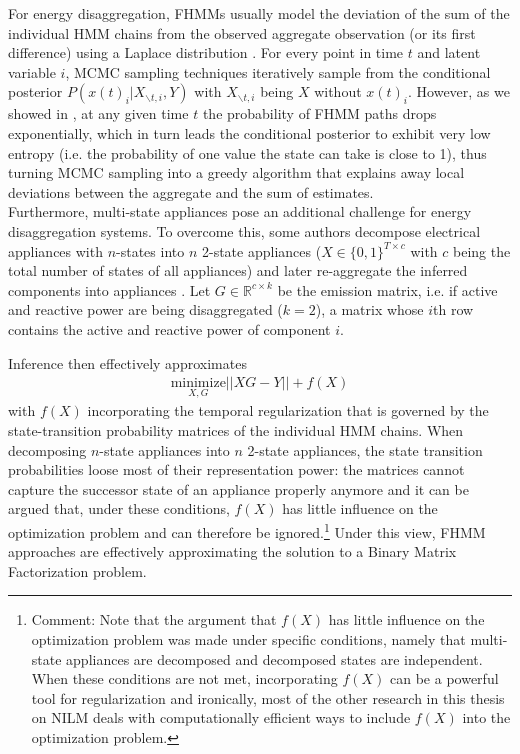 For energy disaggregation, FHMMs usually model the deviation of the sum of the individual HMM chains from the observed aggregate observation (or its first difference) using a Laplace distribution \cite{kolter2012fhmm,lange2016disaggregation}. For every point in time $t$ and latent variable $i$, MCMC sampling techniques iteratively sample from the conditional posterior $P(x(t)_i|X_{\backslash t,i}, Y)$ with $X_{\backslash t,i}$ being $X$ without $x(t)_i$. However, as we showed in \cite{lange2016disaggregation}, at any given time $t$ the probability of FHMM paths drops exponentially, which in turn leads the conditional posterior to exhibit very low entropy (i.e. the probability of one value the state can take is close to 1), thus turning MCMC sampling into a greedy algorithm that explains away local deviations between the aggregate and the sum of estimates.\\
Furthermore, multi-state appliances pose an additional challenge for energy disaggregation systems. To overcome this, some authors decompose electrical appliances with $n$-states into $n$ 2-state appliances ($X \in \{0,1\}^{T\times c}$ with $c$ being the total number of states of all appliances) and later re-aggregate the inferred components into appliances \cite{jiafully}. Let $G \in \mathbb{R}^{c \times k}$ be the emission matrix, i.e. if active and reactive power are being disaggregated ($k=2$), a matrix whose $i$th row contains the active and reactive power of component $i$.

Inference then effectively approximates 
\begin{align*}
\underset{X,G}{\text{minimize}} ||XG - Y|| + f(X)
\end{align*}
 with $f(X)$ incorporating the temporal regularization that is governed by the state-transition probability matrices of the individual HMM chains. When decomposing $n$-state appliances into $n$ 2-state appliances, the state transition probabilities loose most of their representation power: the matrices cannot capture the successor state of an appliance properly anymore and it can be argued that, under these conditions, $f(X)$ has little influence on the optimization problem and can therefore be ignored.\footnote{Comment: Note that the argument that $f(X)$ has little influence on the optimization problem was made under specific conditions, namely that multi-state appliances are decomposed and decomposed states are independent. When these conditions are not met, incorporating $f(X)$ can be a powerful tool for regularization and ironically, most of the other research in this thesis on NILM deals with computationally efficient ways to include $f(X)$ into the optimization problem.} Under this view, FHMM approaches are effectively approximating the solution to a Binary Matrix Factorization problem.


